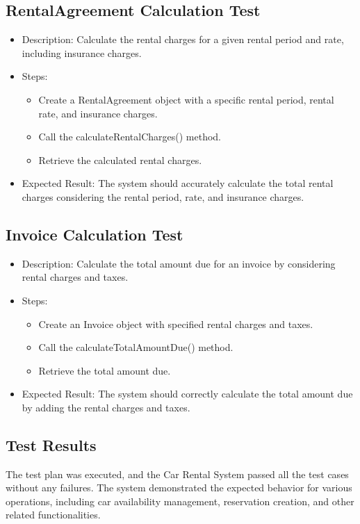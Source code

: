 \documentclass{article}
\begin{document}
\subsection{RentalAgreement Calculation Test}
\begin{itemize}
\item Description: Calculate the rental charges for a given rental period and rate, including insurance charges.
\item Steps:
\begin{itemize}
\item Create a RentalAgreement object with a specific rental period, rental rate, and insurance charges.
\item Call the calculateRentalCharges() method.
\item Retrieve the calculated rental charges.
\end{itemize}
\item Expected Result: The system should accurately calculate the total rental charges considering the rental period, rate, and insurance charges.
\end{itemize}

\subsection{Invoice Calculation Test}
\begin{itemize}
\item Description: Calculate the total amount due for an invoice by considering rental charges and taxes.
\item Steps:
\begin{itemize}
\item Create an Invoice object with specified rental charges and taxes.
\item Call the calculateTotalAmountDue() method.
\item Retrieve the total amount due.
\end{itemize}
\item Expected Result: The system should correctly calculate the total amount due by adding the rental charges and taxes.
\end{itemize}

\subsection{Test Results}

The test plan was executed, and the Car Rental System passed all the test cases without any failures. The system demonstrated the expected behavior for various operations, including car availability management, reservation creation, and other related functionalities.
\end{document}
